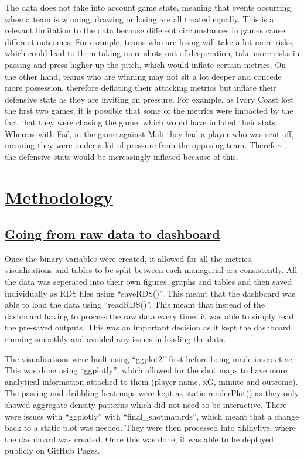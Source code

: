\documentclass[
  11pt,
  letterpaper,
  DIV=11,
  numbers=noendperiod]{scrartcl}
\begin{document}
The data does not take into account game state, meaning that events
occurring when a team is winning, drawing or losing are all treated
equally. This is a relevant limitation to the data because different
circumstances in games cause different outcomes. For example, teams who
are losing will take a lot more risks, which could lead to them taking
more shots out of desperation, take more risks in passing and press
higher up the pitch, which would inflate certain metrics. On the other
hand, teams who are winning may not sit a lot deeper and concede more
possession, therefore deflating their attacking metrics but inflate
their defensive stats as they are inviting on pressure. For example, as
Ivory Coast lost the first two games, it is possible that some of the
metrics were impacted by the fact that they were chasing the game, which
would have inflated their stats. Whereas with Faé, in the game against
Mali they had a player who was sent off, meaning they were under a lot
of pressure from the opposing team. Therefore, the defensive stats would
be increasingly inflated because of this.

\section{\texorpdfstring{\ul{Methodology}}{Methodology}}\label{methodology}

\subsection{\texorpdfstring{\ul{Going from raw data to
dashboard}}{Going from raw data to dashboard}}\label{going-from-raw-data-to-dashboard}

Once the binary variables were created, it allowed for all the metrics,
visualisations and tables to be split between each managerial era
consistently. All the data was seperated into their own figures, graphs
and tables and then saved individually as RDS files using ``saveRDS()''.
This meant that the dashboard was able to load the data using
``readRDS()''. This meant that instead of the dashboard having to
process the raw data every time, it was able to simply read the
pre-saved outputs. This was an important decision as it kept the
dashboard running smoothly and avoided any issues in loading the data.

The visualisations were built using ``ggplot2'' first before being made
interactive. This was done using ``ggplotly'', which allowed for the
shot maps to have more analytical information attached to them (player
name, xG, minute and outcome). The passing and dribbling heatmaps were
kept as static renderPlot() as they only showed aggregate density
patterns which did not need to be interactive. There were issues with
``ggplotly'' with ``final\_shotmap.rds'', which meant that a change back
to a static plot was needed. They were then processed into Shinylive,
where the dashboard was created. Once this was done, it was able to be
deployed publicly on GitHub Pages.
\end{document}
